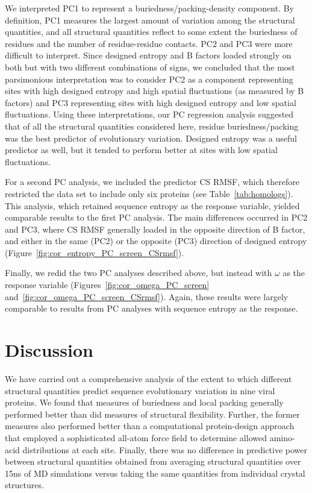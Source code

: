 \documentclass[smallextended]{svjour3}
\begin{document}
We interpreted PC1 to represent a buriedness/packing-density component. By definition, PC1 measures the largest amount of variation among the structural quantities, and all structural quantities reflect to some extent the buriedness of residues and the number of residue-residue contacts. PC2 and PC3 were more difficult to interpret. Since designed entropy and B factors loaded strongly on both but with two different combinations of signs, we concluded that the most parsimonious interpretation was to consider PC2 as a component representing sites with high designed entropy and high spatial fluctuations (as measured by B factors) and PC3 representing sites with high designed entropy and low spatial fluctuations. Using these interpretations, our PC regression analysis suggested that of all the structural quantities considered here, residue buriedness/packing was the best predictor of evolutionary variation. Designed entropy was a useful predictor as well, but it tended to perform better at sites with low spatial fluctuations.

For a second PC analysis, we included the predictor CS RMSF, which therefore restricted the data set to include only six proteins (see Table~\ref{tab:homologs}). This analysis, which retained sequence entropy as the response variable, yielded comparable results to the first PC analysis. The main differences occurred in PC2 and PC3, where CS RMSF generally loaded in the opposite direction of B factor, and either in the same (PC2) or the opposite (PC3) direction of designed entropy (Figure~\ref{fig:cor_entropy_PC_screen_CSrmsf}).

Finally, we redid the two PC analyses described above, but instead with $\omega$ as the response variable (Figures~\ref{fig:cor_omega_PC_screen} and~\ref{fig:cor_omega_PC_screen_CSrmsf}). Again, these results were largely comparable to results from PC analyses with sequence entropy as the response.

\section*{Discussion}

We have carried out a comprehensive analysis of the extent to which different structural quantities predict sequence evolutionary variation in nine viral proteins. We found that measures of buriedness and local packing generally performed better than did measures of structural flexibility. Further, the former measures also performed better than a computational protein-design approach that employed a sophisticated all-atom force field to determine allowed amino-acid distributions at each site. Finally, there was no difference in predictive power between structural quantities obtained from averaging structural quantities over 15ns of MD simulations versus taking the same quantities from individual crystal structures.
\end{document}
